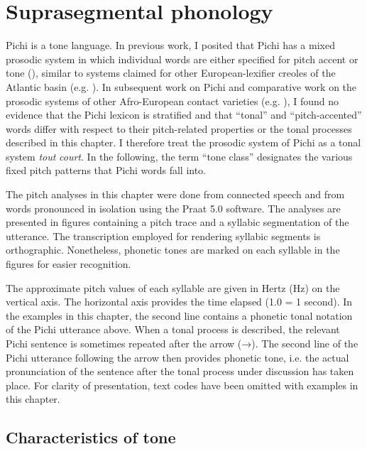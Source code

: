 \chapter{Suprasegmental phonology}

Pichi is a tone language. In previous work, I posited that Pichi has a mixed prosodic system in which individual words are either specified for pitch accent or tone (\citealt{Yakpo2009a,Yakpo2009b}), similar to systems claimed for other European-lexifier creoles of the Atlantic basin (e.g. \citealt{Rountree1972,Alleyne1980,Devonish1989,Devonish2002,Good2004,Castillo1998,CastilloFaraclas2006}). In subsequent work on Pichi and comparative work on the prosodic systems of other Afro-European contact varieties (e.g.  \citealt{SteienYakpo2017}), I found no evidence that the Pichi lexicon is stratified and that “tonal” and “pitch-accented” words differ with respect to their pitch-related properties or the tonal processes described in this chapter. I therefore treat the prosodic system of Pichi as a tonal system \textit{tout} \textit{court}. In the following, the term “tone class” designates the various fixed pitch patterns that Pichi words fall into. 


The pitch analyses in this chapter were done from connected speech and from words pronounced in isolation using the Praat 5.0 software. The analyses are presented in figures containing a pitch trace and a syllabic segmentation of the utterance. The transcription employed for rendering syllabic segments is orthographic. Nonetheless, phonetic tones are marked on each syllable in the figures for easier recognition.



The approximate pitch values of each syllable are given in Hertz (Hz) on the vertical axis. The horizontal axis provides the time elapsed (1.0 = 1 second). In  the examples in this chapter, the second line contains a phonetic tonal notation of the Pichi utterance above. When a tonal process is described, the relevant Pichi sentence is sometimes repeated after the arrow (→). The second line of the Pichi utterance following the arrow then provides phonetic tone, i.e. the actual pronunciation of the sentence after the tonal process under discussion has taken place. For clarity of presentation, text codes have been omitted with examples in this chapter.


\section{Characteristics of tone}\label{sec:3.1}

